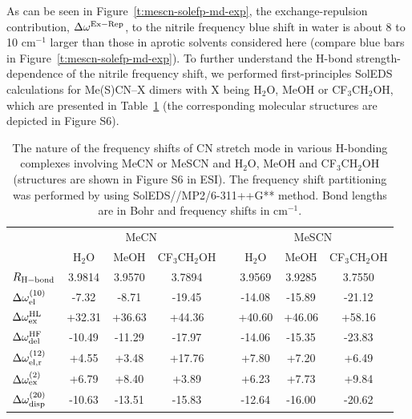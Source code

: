 \documentclass[a4paper,titlepage,twoside,fleqn,12pt]{book}
\begin{document}
\begin{refsection}
As can be seen in Figure~\ref{t:mescn-solefp-md-exp}, the exchange\hyp{}repulsion
contribution, $\Delta\omega^{\rm Ex-Rep}$, to the nitrile frequency blue shift in
water is about 8 to 10 cm$^{-1}$ larger than those in aprotic
solvents considered here (compare blue bars in Figure~\ref{t:mescn-solefp-md-exp}). To
further understand the H-bond strength\hyp{}dependence of the
nitrile frequency shift, we performed first\hyp{}principles SolEDS
calculations for Me(S)CN--X dimers with X being H$_2$O, MeOH or
CF$_3$CH$_2$OH, which are presented in Table~\ref{t:mescn-soleds} (the corresponding
molecular structures are depicted in Figure S6). 
%
\begin{table}[t!]
\caption{
The nature of the frequency shifts of CN stretch mode in various 
H-bonding complexes involving MeCN or MeSCN and H$_2$O, MeOH 
and CF$_3$CH$_2$OH (structures are shown in Figure S6 in ESI). 
The frequency shift partitioning was performed by using 
SolEDS//MP2/6-311++G** method. Bond lengths are in Bohr and frequency shifts in
cm$^{-1}$.
\label{t:mescn-soleds}}
\begin{tabular*}{1.0\textwidth}{@{\extracolsep{\fill} } l ccc c ccc}
\hline\hline
                                 & \multicolumn{3}{c}{MeCN}            && \multicolumn{3}{c}{MeSCN}             \\
                                 & H$_2$O &    MeOH  &  CF$_3$CH$_2$OH &&  H$_2$O   &  MeOH   &  CF$_3$CH$_2$OH \\
\hline
$R_{\rm H-bond}$                 & 3.9814 &   3.9570 &  3.7894         &&  3.9569   &  3.9285 &    3.7550       \\ 
$\Delta\omega^{(10)}_{\rm el}$   & -7.32  &    -8.71 &     -19.45      &&  -14.08   &  -15.89 &    -21.12       \\
$\Delta\omega^{\rm HL}_{\rm ex}$ & +32.31 &   +36.63 &     +44.36      &&  +40.60   &  +46.06 &    +58.16       \\
$\Delta\omega^{\rm HF}_{\rm del}$& -10.49 &   -11.29 &     -17.97      &&  -14.06   &  -15.35 &    -23.83       \\
$\Delta\omega^{(12)}_{\rm el,r}$ &  +4.55 &    +3.48 &     +17.76      &&   +7.80   &   +7.20 &     +6.49       \\
$\Delta\omega^{(2)}_{\rm ex}$    &  +6.79 &    +8.40 &      +3.89      &&   +6.23   &   +7.73 &     +9.84       \\
$\Delta\omega^{(20)}_{\rm disp}$ & -10.63 &   -13.51 &     -15.83      &&  -12.64   &  -16.00 &    -20.62       \\

\end{tabular*}
\end{table}
\end{refsection}
\end{document}

